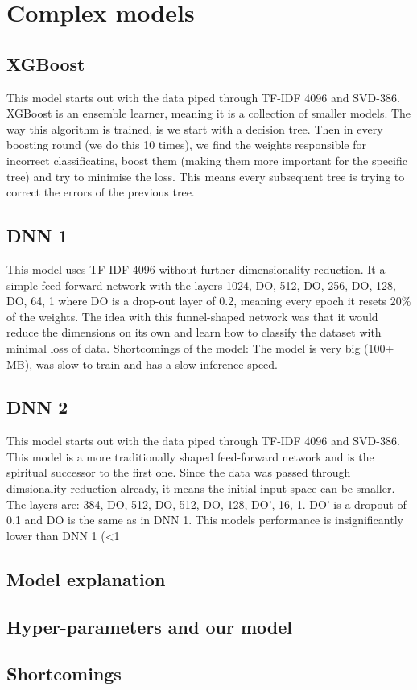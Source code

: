 \section{Complex models}
\subsection{XGBoost}
This model starts out with the data piped through TF-IDF 4096 and SVD-386. XGBoost is an ensemble learner, meaning it is a collection of smaller models. The way this algorithm is trained, is we start with a decision tree. Then in every boosting round (we do this 10 times), we find the weights responsible for incorrect classificatins, boost them (making them more important for the specific tree) and try to minimise the loss. This means every subsequent tree is trying to correct the errors of the previous tree.

\subsection{DNN 1}
This model uses TF-IDF 4096 without further dimensionality reduction. It a simple feed-forward network with the layers 1024, DO, 512, DO, 256, DO, 128, DO, 64, 1 where DO is a drop-out layer of 0.2, meaning every epoch it resets 20\% of the weights. The idea with this funnel-shaped network was that it would reduce the dimensions on its own and learn how to classify the dataset with minimal loss of data. Shortcomings of the model: The model is very big (100+ MB), was slow to train and has a slow inference speed.

\subsection{DNN 2}
This model starts out with the data piped through TF-IDF 4096 and SVD-386. This model is a more traditionally shaped feed-forward network and is the spiritual successor to the first one. Since the data was passed through dimsionality reduction already, it means the initial input space can be smaller. The layers are: 384, DO, 512, DO, 512, DO, 128, DO', 16, 1. DO' is a dropout of 0.1 and DO is the same as in DNN 1. This models performance is insignificantly lower than DNN 1 (<1%

\subsection{Model explanation}
\subsection{Hyper-parameters and our model}
\subsection{Shortcomings}
